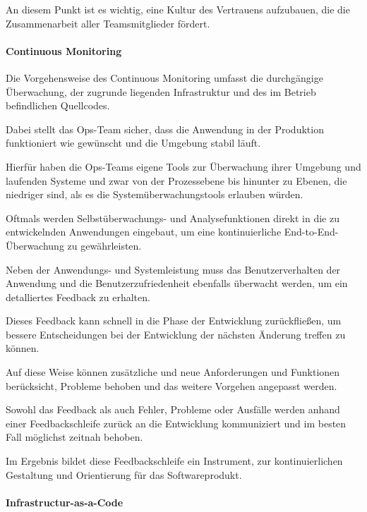 An diesem Punkt ist es wichtig, eine Kultur des Vertrauens aufzubauen, die die Zusammenarbeit aller Teamsmitglieder fördert. \cite{humble_why_2011} 

\paragraph{Continuous Monitoring}

Die Vorgehensweise des Continuous Monitoring umfasst die durchgängige Überwachung, der zugrunde liegenden Infrastruktur und des im Betrieb befindlichen Quellcodes. \cite{van_hoorn_continuous_2012} 

Dabei stellt das Ops-Team sicher, dass die Anwendung in der Produktion funktioniert wie gewünscht und die Umgebung stabil läuft. 

Hierfür haben die Ops-Teams eigene Tools zur Überwachung ihrer Umgebung und laufenden Systeme und zwar von der Prozessebene bis hinunter zu Ebenen, die niedriger sind, als es die Systemüberwachungstools erlauben würden. \cite[S. 26]{sharma_devops_2017}

Oftmals werden Selbstüberwachungs- und Analysefunktionen direkt in die zu entwickelnden Anwendungen eingebaut, um eine kontinuierliche End-to-End-Überwachung zu gewährleisten. \cite[S. 26]{sharma_devops_2017}

Neben der Anwendungs- und Systemleistung muss das Benutzerverhalten der Anwendung und die Benutzerzufriedenheit ebenfalls überwacht werden, um ein detalliertes Feedback zu erhalten. \cite[S. 112 - 113]{erder_continuous_2016}

Dieses Feedback kann schnell in die Phase der Entwicklung zurückfließen, um bessere Entscheidungen bei der Entwicklung der nächsten Änderung treffen zu können. 

Auf diese Weise können zusätzliche und neue Anforderungen und Funktionen berücksicht, Probleme behoben und das weitere Vorgehen angepasst werden. 

Sowohl das Feedback als auch Fehler, Probleme oder Ausfälle werden anhand einer Feedbackschleife zurück an die Entwicklung kommuniziert und im besten Fall möglichst zeitnah behoben. \cite[S. 112 - 113]{erder_continuous_2016} 

Im Ergebnis bildet diese Feedbackschleife ein Instrument, zur kontinuierlichen Gestaltung und Orientierung für das Softwareprodukt.   

\paragraph{Infrastructur-as-a-Code}

